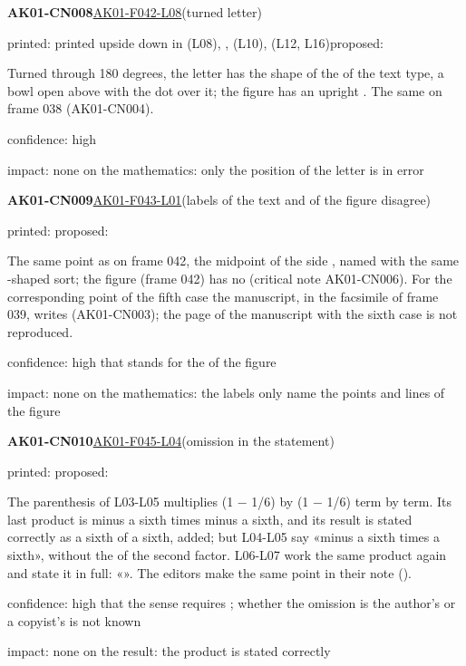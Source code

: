 \documentclass[11pt]{article}
\begin{document}
\noindent\textbf{AK01-CN008}\enspace\hyperlink{AK01-F042-L08}{AK01-F042-L08}\enspace(turned letter)\par\noindent printed:  printed upside down in  (L08), ,  (L10),  (L12, L16)\enspace proposed: \par\noindent Turned through 180 degrees, the letter has the shape of the  of the text type, a bowl open above with the dot over it; the figure has an upright . The same on frame 038 (AK01-CN004).\par\noindent confidence: high\par\noindent impact: none on the mathematics: only the position of the letter is in error\par\medskip
\noindent\textbf{AK01-CN009}\enspace\hyperlink{AK01-F043-L01}{AK01-F043-L01}\enspace(labels of the text and of the figure disagree)\par\noindent printed: \enspace proposed: \par\noindent The same point as on frame 042, the midpoint of the side , named with the same -shaped sort; the figure (frame 042) has no  (critical note AK01-CN006). For the corresponding point of the fifth case the manuscript, in the facsimile of frame 039, writes  (AK01-CN003); the page of the manuscript with the sixth case is not reproduced.\par\noindent confidence: high that  stands for the  of the figure\par\noindent impact: none on the mathematics: the labels only name the points and lines of the figure\par\medskip
\noindent\textbf{AK01-CN010}\enspace\hyperlink{AK01-F045-L04}{AK01-F045-L04}\enspace(omission in the statement)\par\noindent printed: \enspace proposed: \par\noindent The parenthesis of L03-L05 multiplies (1 − 1/6) by (1 − 1/6) term by term. Its last product is minus a sixth times minus a sixth, and its result is stated correctly as a sixth of a sixth, added; but L04-L05 say «minus a sixth times a sixth», without the  of the second factor. L06-L07 work the same product again and state it in full: «». The editors make the same point in their note ().\par\noindent confidence: high that the sense requires ; whether the omission is the author's or a copyist's is not known\par\noindent impact: none on the result: the product is stated correctly\par\medskip
\end{document}
